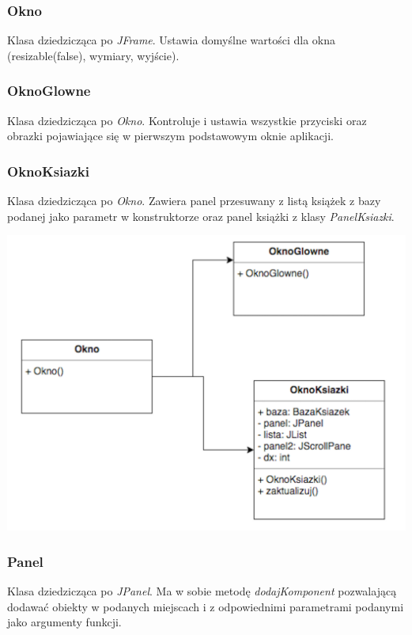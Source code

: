 \documentclass[a4paper,10pt]{article}
\begin{document}
\begin{enumerate}
\subsubsection{Okno}
Klasa dziedzicząca po \textit{JFrame}. Ustawia domyślne wartości dla okna (resizable(false), wymiary, wyjście).

\subsubsection{OknoGlowne}
Klasa dziedzicząca po \textit{Okno}. Kontroluje i ustawia wszystkie przyciski oraz obrazki pojawiające się w pierwszym podstawowym oknie aplikacji.

\subsubsection{OknoKsiazki}
Klasa dziedzicząca po \textit{Okno}. Zawiera panel przesuwany z listą książek z bazy podanej jako parametr w konstruktorze oraz panel książki z klasy \textit{PanelKsiazki}.

\begin{center}
\includegraphics[scale=0.18]{UML3.png}
\end{center}

\subsubsection{Panel}
Klasa dziedzicząca po \textit{JPanel}. Ma w sobie metodę \textit{dodajKomponent} pozwalającą dodawać obiekty w podanych miejscach i z odpowiednimi parametrami podanymi jako argumenty funkcji.


\end{enumerate}
\end{document}
